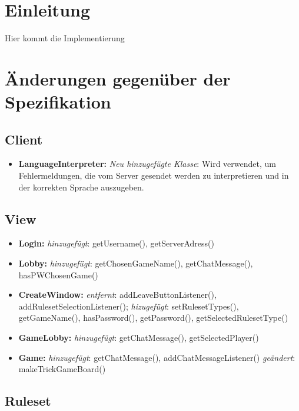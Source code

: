 \documentclass{article}
\begin{document}
\tableofcontents
\newpage

\section{Einleitung}
Hier kommt die Implementierung

\newpage

\section{Änderungen gegenüber der Spezifikation}

\subsection{Client}

\begin{itemize}
\item  \textbf{LanguageInterpreter:}  \textit{Neu hinzugefügte Klasse}: Wird verwendet, um Fehlermeldungen, die vom Server gesendet werden zu interpretieren und in der korrekten Sprache auszugeben.
\end{itemize}

\subsection{View}

\begin{itemize}
\item \textbf{Login:} \textit{hinzugefügt}: getUsername(), getServerAdress()
\item \textbf{Lobby:} \textit{hinzugefügt}: getChosenGameName(), getChatMessage(), hasPWChosenGame()
\item \textbf{CreateWindow:} \textit{entfernt}: addLeaveButtonListener(), addRulesetSelectionListener(); \textit{hizugefügt}: setRulesetTypes(), getGameName(), hasPassword(), getPassword(), getSelectedRulesetType()
\item \textbf{GameLobby:} \textit{hinzugefügt}: getChatMessage(), getSelectedPlayer()
\item \textbf{Game:} \textit{hinzugefügt}: getChatMessage(), addChatMessageListener() \textit{geändert}: makeTrickGameBoard()
\end{itemize}

\subsection{Ruleset}
\end{document}
